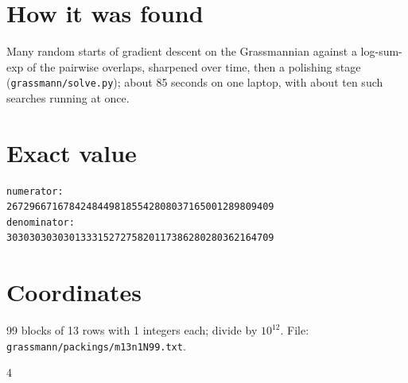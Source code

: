 \documentclass[11pt,a4paper]{article}
\begin{document}
\section{How it was found}
Many random starts of gradient descent on the Grassmannian against a log-sum-exp of the pairwise overlaps, sharpened over time, then a polishing stage (\texttt{grassmann/solve.py}); about 85 seconds on one laptop, with about ten such searches running at once.


\appendix
\section{Exact value}
{\small
\begin{verbatim}
numerator:
26729667167842484498185542808037165001289809409
denominator:
30303030303013331527275820117386280280362164709
\end{verbatim}}

\section{Coordinates}
99 blocks of 13 rows with 1 integers each; divide by $10^{12}$. File: \texttt{grassmann/packings/m13n1N99.txt}.
{\tiny
\begin{multicols}{4}
\end{multicols}}
\end{document}
